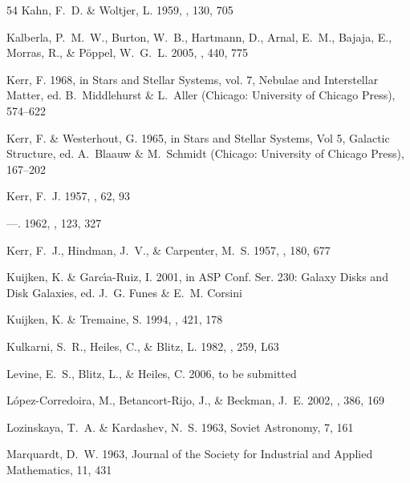 \documentclass[apj]{emulateapj}
\begin{document}
\begin{thebibliography}{54}
{Kahn}, F.~D. \& {Woltjer}, L. 1959, \apj, 130, 705

{Kalberla}, P.~M.~W., {Burton}, W.~B., {Hartmann}, D., {Arnal}, E.~M.,
  {Bajaja}, E., {Morras}, R., \& {P{\"o}ppel}, W.~G.~L. 2005, \aap, 440, 775

Kerr, F. 1968, in Stars and Stellar Systems, vol. 7, Nebulae and Interstellar
  Matter, ed. B.~Middlehurst \& L.~Aller (Chicago: University of Chicago
  Press), 574--622

Kerr, F. \& Westerhout, G. 1965, in Stars and Stellar Systems, Vol 5, Galactic
  Structure, ed. A.~Blaauw \& M.~Schmidt (Chicago: University of Chicago
  Press), 167--202

{Kerr}, F.~J. 1957, \aj, 62, 93

---. 1962, \mnras, 123, 327

{Kerr}, F.~J., {Hindman}, J.~V., \& {Carpenter}, M.~S. 1957, \nat, 180, 677

{Kuijken}, K. \& {Garc{\'{\i}}a-Ruiz}, I. 2001, in ASP Conf. Ser. 230: Galaxy
  Disks and Disk Galaxies, ed. J.~G. {Funes} \& E.~M. {Corsini}

{Kuijken}, K. \& {Tremaine}, S. 1994, \apj, 421, 178

{Kulkarni}, S.~R., {Heiles}, C., \& {Blitz}, L. 1982, \apjl, 259, L63

Levine, E.~S., Blitz, L., \& Heiles, C. 2006, {to be submitted}

{L{\'o}pez-Corredoira}, M., {Betancort-Rijo}, J., \& {Beckman}, J.~E. 2002,
  \aap, 386, 169

{Lozinskaya}, T.~A. \& {Kardashev}, N.~S. 1963, Soviet Astronomy, 7, 161

{Marquardt}, D.~W. 1963, {Journal of the Society for Industrial and Applied
  Mathematics}, 11, 431


\end{thebibliography}
\end{document}
